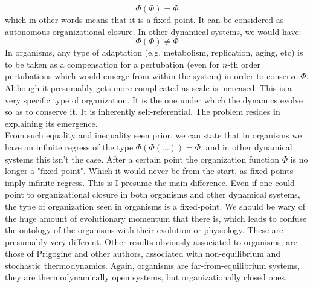 \documentclass[a4paper,12pt,twoside,leqno]{article}
\begin{document}
$$
\Phi (\Phi) = \Phi
$$
which in other words means that it is a fixed-point. It can be considered as autonomous organizational closure. In other dynamical systems, we would have:
$$
\Phi (\Phi) \neq \Phi
$$
In organisms, any type of adaptation (e.g. metabolism, replication, aging, etc) is to be taken as a compensation for a pertubation (even for $n$-th order pertubations which would emerge from within the system) in order to conserve $\Phi$. Although it presumably gets more complicated as scale is increased. This is a very specific type of organization. It is the one under which the dynamics evolve so as to conserve it. It is inherently self-referential. The problem resides in explaining its emergence.\\
From such equality and inequality seen prior, we can state that in organisms we have an infinite regress of the type $\Phi(\Phi(...)) = \Phi$, and in other dynamical systems this isn't the case. After a certain point the organization function $\Phi$ is no longer a "fixed-point". Which it would never be from the start, as fixed-points imply infinite regress. This is I presume the main difference. Even if one could point to organizational closure in both organisms and other dynamical systems, the type of organization seen in organisms is a fixed-point. We should be wary of the huge amount of evolutionary momentum that there is, which leads to confuse the ontology of the organisms with their evolution or physiology. These are presumably very different. Other results obviously associated to organisms, are those of Prigogine and other authors, associated with non-equilibrium and stochastic thermodynamics. Again, organisms are far-from-equilibrium systems, they are thermodynamically open systems, but organizationally closed ones. 
\end{document}
